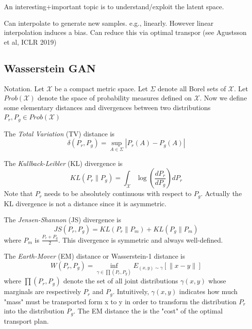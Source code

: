 \documentclass[english]{article}
\begin{document}
\item An interesting+important topic is to understand/exploit the latent space.

Can interpolate to generate new samples. e.g., linearly. However linear interpolation induces a bias. Can reduce this via optimal transpor (see Agustsson et al, ICLR 2019)



\eenum

\subsection{Wasserstein GAN}

\benum
\item {Notation}.
 Let $\mathcal{X}$ be a compact metric space. Let $\Sigma$ denote all Borel sets of  $\mathcal{X}$. Let $Prob(\mathcal{X})$ denote the space of probability measures defined on $\mathcal{X}$. Now we define some elementary distances and divergences between two distributions $P_r, P_g \in Prob(\mathcal{X})$


\item {The \emph{Total Variation} (TV) distance} is
$$ \delta(P_r, P_g)= \sup_{A\in \Sigma} {|P_r {(A)}-P_g {(A)}|}$$





\item {The \emph{Kullback-Leibler} (KL) divergence} is
 $$ KL(P_r \|P_g)= \int_\mathcal{X} \log(\frac{dP_r}{dP_g})dP_r$$
 Note that $P_r$ needs to be absolutely continuous with respect to $P_g$. Actually the KL divergence is not a distance since it is asymmetric.
 




\item {The \emph{Jensen-Shannon} (JS) divergence} is
$$ JS(P_r,P_g)=KL(P_r \|P_m)+ KL(P_g \|P_m)$$
where $P_m$ is $\frac{P_r+P_g}{2}$. This divergence is symmetric and always well-defined.






\item {The \emph{Earth-Mover} (EM) distance or Wasserstein-1 distance} is
$$W(P_r,P_g)=\inf_{\gamma \in \prod(P_r,P_g)} E_{(x,y)\sim \gamma} [\|x-y\|]$$
where $\prod(P_r,P_g)$ denote the set of all joint distributions $\gamma(x,y)$ whose marginals are respectively $P_r$ and $P_g$. Intuitively, $\gamma(x,y)$ indicates how much "mass" must be transported form x to y in order to transform the distribution $P_r$ into the distribution $P_g$. The EM distance the is the "cost" of the optimal transport plan.
\end{document}

